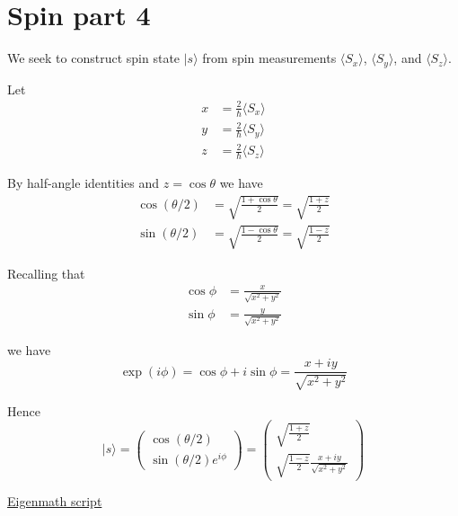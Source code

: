 

\section*{Spin part 4}

We seek to construct spin state $|s\rangle$ from spin measurements
$\langle S_x\rangle$, $\langle S_y\rangle$, and $\langle S_z\rangle$.

\bigskip
Let
\begin{align*}
x&=\frac{2}{\hbar}\langle S_x\rangle
\\[1ex]
y&=\frac{2}{\hbar}\langle S_y\rangle
\\[1ex]
z&=\frac{2}{\hbar}\langle S_z\rangle
\end{align*}

By half-angle identities and $z=\cos\theta$ we have
\begin{align*}
\cos(\theta/2)&=\sqrt{\frac{1+\cos\theta}{2}}=\sqrt{\frac{1+z}{2}}
\\[1ex]
\sin(\theta/2)&=\sqrt{\frac{1-\cos\theta}{2}}=\sqrt{\frac{1-z}{2}}
\end{align*}

Recalling that
\begin{align*}
\cos\phi&=\frac{x}{\sqrt{x^2+y^2}}
\\[1ex]
\sin\phi&=\frac{y}{\sqrt{x^2+y^2}}
\end{align*}

we have
\begin{equation*}
\exp(i\phi)=\cos\phi+i\sin\phi=\frac{x+iy}{\sqrt{x^2+y^2}}
\end{equation*}

Hence
\begin{equation*}
|s\rangle=\begin{pmatrix}
\cos(\theta/2)
\\[1ex]
\sin(\theta/2)e^{i\phi}
\end{pmatrix}
=\begin{pmatrix}
\sqrt{\frac{1+z}{2}}
\\[2ex]
\sqrt{\frac{1-z}{2}}\frac{x+iy}{\sqrt{x^2+y^2}}
\end{pmatrix}
\tag{1}
\end{equation*}

\href{https://georgeweigt.github.io/examples/spin-part-4-demo.html}{Eigenmath script}


